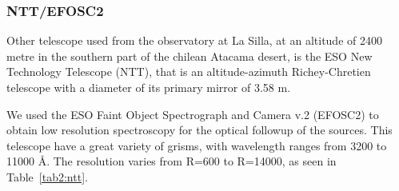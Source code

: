 \subsubsection{NTT/EFOSC2}
\label{sec2:ntt}

Other telescope used from the observatory at La Silla, at an altitude of 2400 metre in the southern part of the chilean Atacama desert, is the ESO New Technology Telescope (NTT), that is an altitude-azimuth Richey-Chretien telescope with a diameter of its primary mirror of 3.58 m.

We used the ESO Faint Object Spectrograph and Camera v.2 (EFOSC2) to obtain low resolution spectroscopy for the optical followup of the sources. This telescope have a great variety of grisms, with wavelength ranges from 3200 to 11000 \AA. The resolution varies from R=600 to R=14000, as seen in Table~\ref{tab2:ntt}.

